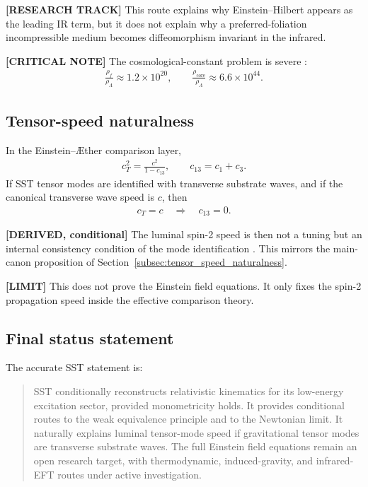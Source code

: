\textbf{[RESEARCH TRACK]} This route explains why Einstein--Hilbert appears as
the leading IR term, but it does not explain why a preferred-foliation
incompressible medium becomes diffeomorphism invariant in the infrared.

\textbf{[CRITICAL NOTE]} The cosmological-constant problem is severe
\cite{Planck2018Cosmology}:
\begin{align}
    \frac{\rho_{\!f}}{\rho_\Lambda}
    \approx
    1.2\times10^{20},
    \qquad
    \frac{\rho_{\mathrm{core}}}{\rho_\Lambda}
    \approx
    6.6\times10^{44}.
\end{align}

\subsection{Tensor-speed naturalness}

In the Einstein--\AE ther comparison layer,
\begin{align}
    c_T^2
    =
    \frac{c^2}{1-c_{13}},
    \qquad
    c_{13}=c_1+c_3 .
\end{align}
If SST tensor modes are identified with transverse substrate waves, and if the
canonical transverse wave speed is \(c\), then
\begin{align}
    c_T=c
    \quad\Rightarrow\quad
    c_{13}=0 .
\end{align}

\textbf{[DERIVED, conditional]} The luminal spin-2 speed is then not a tuning
but an internal consistency condition of the mode identification
\cite{FosterJacobson2006,Abbott2017GW170817}. This mirrors the main-canon
proposition of Section~\ref{subsec:tensor_speed_naturalness}.

\textbf{[LIMIT]} This does not prove the Einstein field equations. It only
fixes the spin-2 propagation speed inside the effective comparison theory.

\subsection{Final status statement}

The accurate SST statement is:

\begin{quote}
SST conditionally reconstructs relativistic kinematics for its low-energy
excitation sector, provided monometricity holds. It provides conditional routes
to the weak equivalence principle and to the Newtonian limit. It naturally
explains luminal tensor-mode speed if gravitational tensor modes are transverse
substrate waves. The full Einstein field equations remain an open research
target, with thermodynamic, induced-gravity, and infrared-EFT routes under
active investigation.
\end{quote}

